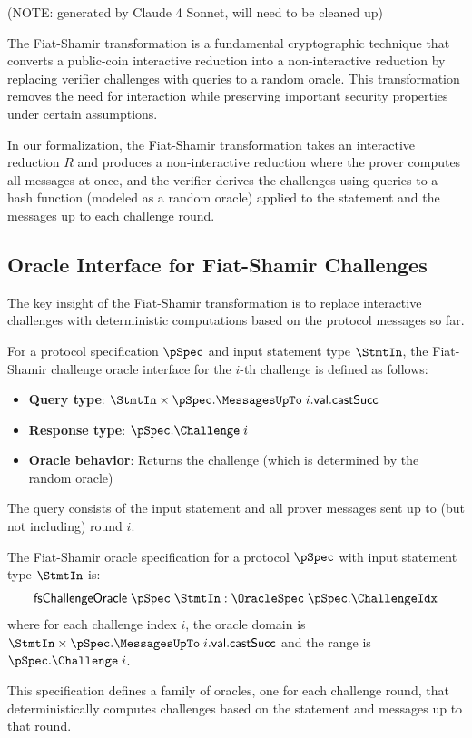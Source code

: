 (NOTE: generated by Claude 4 Sonnet, will need to be cleaned up)

The Fiat-Shamir transformation is a fundamental cryptographic technique that converts a public-coin interactive reduction into a non-interactive reduction by replacing verifier challenges with queries to a random oracle. This transformation removes the need for interaction while preserving important security properties under certain assumptions.

In our formalization, the Fiat-Shamir transformation takes an interactive reduction $R$ and produces a non-interactive reduction where the prover computes all messages at once, and the verifier derives the challenges using queries to a hash function (modeled as a random oracle) applied to the statement and the messages up to each challenge round.

\subsection{Oracle Interface for Fiat-Shamir Challenges}\label{sec:fiat_shamir_oracle_interface}

The key insight of the Fiat-Shamir transformation is to replace interactive challenges with deterministic computations based on the protocol messages so far.

\begin{definition}
    \label{def:fiat_shamir_challenge_oracle_interface}
    For a protocol specification $\pSpec$ and input statement type $\StmtIn$, the Fiat-Shamir challenge oracle interface for the $i$-th challenge is defined as follows:
    \begin{itemize}
        \item \textbf{Query type}: $\StmtIn \times \pSpec.\MessagesUpTo \;i.\mathsf{val}.\mathsf{castSucc}$
        \item \textbf{Response type}: $\pSpec.\Challenge \;i$
        \item \textbf{Oracle behavior}: Returns the challenge (which is determined by the random oracle)
    \end{itemize}

    The query consists of the input statement and all prover messages sent up to (but not including) round $i$.
\end{definition}

\begin{definition}
    \label{def:fiat_shamir_spec}
    The Fiat-Shamir oracle specification for a protocol $\pSpec$ with input statement type $\StmtIn$ is:
    \[ \mathsf{fsChallengeOracle} \;\pSpec \;\StmtIn : \OracleSpec \;\pSpec.\ChallengeIdx \]
    where for each challenge index $i$, the oracle domain is $\StmtIn \times \pSpec.\MessagesUpTo \;i.\mathsf{val}.\mathsf{castSucc}$ and the range is $\pSpec.\Challenge \;i$.

    This specification defines a family of oracles, one for each challenge round, that deterministically computes challenges based on the statement and messages up to that round.
\end{definition}

